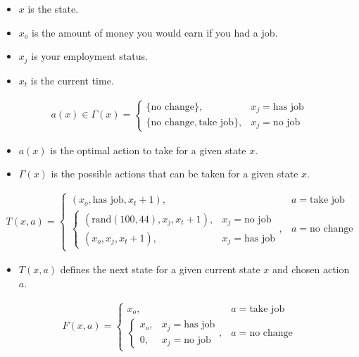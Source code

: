 \documentclass[a4paper, 12pt]{article}
\begin{document}
\begin{itemize}
  \item $x$ is the state.
  \item $x_{o}$ is the amount of money you would earn if you had a job.
  \item $x_{j}$ is your employment status.
  \item $x_{t}$ is the current time.
\end{itemize}

\[
\begin{aligned}
  a(x) \in \Gamma(x) = \begin{cases}
    \{\text{no change}\}, & x_{j} = \text{has job} \\
    \{\text{no change}, \text{take job}\}, & x_{j} = \text{no job}
  \end{cases}
\end{aligned}
\]

\begin{itemize}
  \item $a(x)$ is the optimal action to take for a given state $x$.
  \item $\Gamma(x)$ is the possible actions that can be taken for
    a given state $x$.
\end{itemize}

\[
\begin{aligned}
  T(x, a) = \begin{cases}
    (x_{o}, \text{has job}, x_{t} + 1), & a = \text{take job} \\
    \begin{cases}
      (\text{rand}(100, 44), x_{j}, x_{t}+1), & x_{j} = \text{no job} \\
      (x_{o}, x_{j}, x_{t}+1), & x_{j} = \text{has job}
    \end{cases}, & a = \text{no change}
  \end{cases}
\end{aligned}
\]

\begin{itemize}
  \item $T(x, a)$ defines the next state for a given current state
    $x$ and chosen action $a$.
\end{itemize}

\[
\begin{aligned}
  F(x, a) = \begin{cases}
    x_{o}, & a=\text{take job} \\
    \begin{cases}
      x_{o}, & x_{j}=\text{has job} \\
      0, & x_{j} = \text{no job}
    \end{cases}, & a=\text{no change}
  \end{cases}
\end{aligned}
\]
\end{document}

